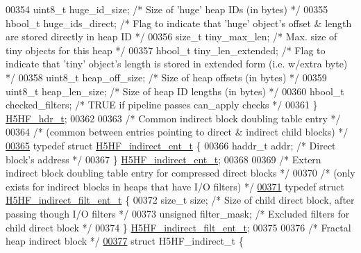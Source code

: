 \begin{DoxyCode}
00354     uint8\_t     huge\_id\_size;   \textcolor{comment}{/* Size of 'huge' heap IDs (in bytes) */}
00355     hbool\_t     huge\_ids\_direct; \textcolor{comment}{/* Flag to indicate that 'huge' object's offset & length are stored
       directly in heap ID */}
00356     \textcolor{keywordtype}{size\_t}      tiny\_max\_len;   \textcolor{comment}{/* Max. size of tiny objects for this heap */}
00357     hbool\_t     tiny\_len\_extended; \textcolor{comment}{/* Flag to indicate that 'tiny' object's length is stored in extended
       form (i.e. w/extra byte) */}
00358     uint8\_t     heap\_off\_size;  \textcolor{comment}{/* Size of heap offsets (in bytes) */}
00359     uint8\_t     heap\_len\_size;  \textcolor{comment}{/* Size of heap ID lengths (in bytes) */}
00360     hbool\_t     checked\_filters; \textcolor{comment}{/* TRUE if pipeline passes can\_apply checks */}
00361 \} \hyperlink{struct_h5_h_f__hdr__t}{H5HF\_hdr\_t};
00362 
00363 \textcolor{comment}{/* Common indirect block doubling table entry */}
00364 \textcolor{comment}{/* (common between entries pointing to direct & indirect child blocks) */}
\hyperlink{struct_h5_h_f__indirect__ent__t}{00365} \textcolor{keyword}{typedef} \textcolor{keyword}{struct }\hyperlink{struct_h5_h_f__indirect__ent__t}{H5HF\_indirect\_ent\_t} \{
00366     haddr\_t     addr;           \textcolor{comment}{/* Direct block's address                     */}
00367 \} \hyperlink{struct_h5_h_f__indirect__ent__t}{H5HF\_indirect\_ent\_t};
00368 
00369 \textcolor{comment}{/* Extern indirect block doubling table entry for compressed direct blocks */}
00370 \textcolor{comment}{/* (only exists for indirect blocks in heaps that have I/O filters) */}
\hyperlink{struct_h5_h_f__indirect__filt__ent__t}{00371} \textcolor{keyword}{typedef} \textcolor{keyword}{struct }\hyperlink{struct_h5_h_f__indirect__filt__ent__t}{H5HF\_indirect\_filt\_ent\_t} \{
00372     \textcolor{keywordtype}{size\_t}     size;            \textcolor{comment}{/* Size of child direct block, after passing though I/O filters */}
00373     \textcolor{keywordtype}{unsigned}    filter\_mask;    \textcolor{comment}{/* Excluded filters for child direct block */}
00374 \} \hyperlink{struct_h5_h_f__indirect__filt__ent__t}{H5HF\_indirect\_filt\_ent\_t};
00375 
00376 \textcolor{comment}{/* Fractal heap indirect block */}
\hyperlink{struct_h5_h_f__indirect__t}{00377} \textcolor{keyword}{struct }H5HF\_indirect\_t \{

\end{DoxyCode}
